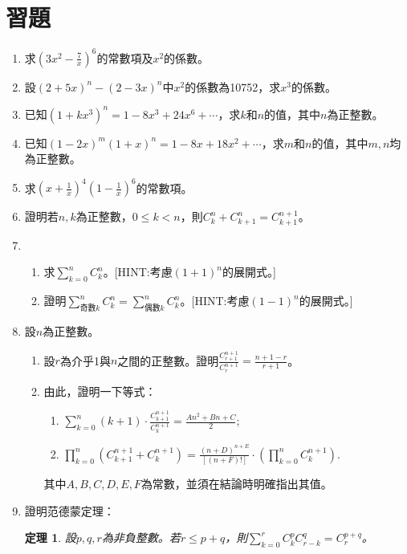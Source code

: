 \documentclass[12pt]{article}
\newtheorem*{theorem}{定理}
\begin{document}
    \section*{習題}
    \begin{enumerate}
        \item 求$(3x^2-\frac{7}{x})^6$的常數項及$x^2$的係數。
        \item 設$(2+5x)^n-(2-3x)^n$中$x^2$的係數為10752，求$x^3$的係數。
        \item 已知$(1+kx^3)^n=1-8x^3+24x^6+\cdots$，求$k$和$n$的值，其中$n$為正整數。
        \item 已知$(1-2x)^m(1+x)^n=1-8x+18x^2+\cdots$，求$m$和$n$的值，其中$m,n$均為正整數。
        \item 求$(x+\frac{1}{x})^4(1-\frac{1}{x})^6$的常數項。
        \item 證明若$n,k$為正整數，$0\leq k< n$，則$C_k^n+C_{k+1}^n=C_{k+1}^{n+1}$。
        \item \begin{enumerate}
            \item 求$\sum_{k=0}^n C_k^n$。[HINT:考慮$(1+1)^n$的展開式。]
            \item 證明$\sum_{\textrm{奇數}k}^n C_k^n=\sum_{\textrm{偶數}k}^n C_k^n$。[HINT:考慮$(1-1)^n$的展開式。]
        \end{enumerate}
        \item 設$n$為正整數。\begin{enumerate}
            \item 設$r$為介乎1與$n$之間的正整數。證明$\frac{C_{r+1}^{n+1}}{C_r^{n+1}}=\frac{n+1-r}{r+1}$。
            \item 由此，證明一下等式：\begin{enumerate}
                \item $\displaystyle \sum_{k=0}^{n}(k+1)\cdot\frac{C_{k+1}^{n+1}}{C_k^{n+1}}=\frac{An^2+Bn+C}{2}$;
                \item $\displaystyle \prod_{k=0}^{n}(C_{k+1}^{n+1}+C_{k}^{n+1})=\frac{(n+D)^{n+E}}{[(n+F)!]}\cdot (\prod_{k=0}^{n}C_k^{n+1})$.
            \end{enumerate}
            其中$A,B,C,D,E,F$為常數，並須在結論時明確指出其值。
        \end{enumerate}
        \item 證明范德蒙定理：\begin{theorem}
            設$p,q,r$為非負整數。若$r\leq p+q$，則$\sum_{k=0}^{r}C_k^p C_{r-k}^q=C_r^{p+q}$。
        \end{theorem}

\end{enumerate}
\end{document}
